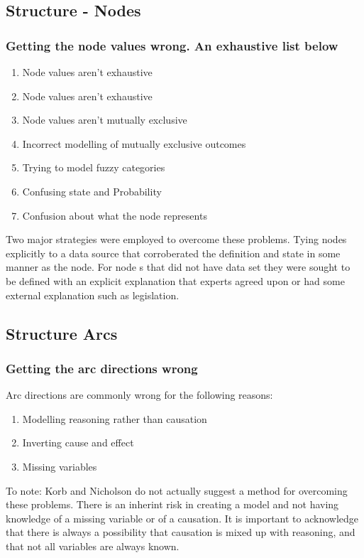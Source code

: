 \subsection{Structure - Nodes}
\subsubsection{Getting the node values wrong. An exhaustive list below}
\begin{enumerate}
        \item Node values aren't exhaustive
        \item Node values aren't exhaustive
        \item Node values aren't mutually exclusive
        \item Incorrect modelling of mutually exclusive outcomes
        \item Trying to model fuzzy categories
        \item Confusing state and Probability
        \item Confusion about what the node represents
\end{enumerate}
Two major strategies were employed to overcome these problems. Tying nodes explicitly to a data source that corroberated the definition and state in some manner as the node. For node s that did not have data set they were sought to be defined with an explicit explanation that experts agreed upon or had some external explanation such as legislation.
\subsection{Structure Arcs}
\subsubsection{Getting the arc directions wrong}
Arc directions are commonly wrong for the following reasons:
\begin{enumerate}
        \item Modelling reasoning rather than causation
        \item Inverting cause and effect
        \item Missing variables
\end{enumerate}
To note: Korb and Nicholson do not actually suggest a method for overcoming these problems. There is an inherint risk in creating a model and not having knowledge of a missing variable or of a causation. It is important to acknowledge that there is always a possibility that causation is mixed up with reasoning, and that not all variables are always known.
